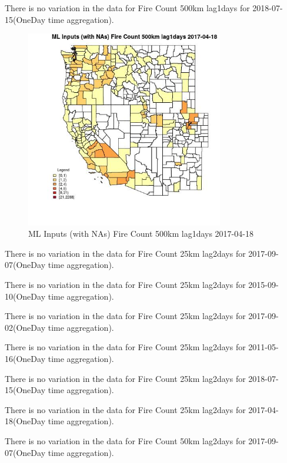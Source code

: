 There is no variation in the data for Fire Count 500km lag1days for 2018-07-15(OneDay time aggregation). 
 

\begin{figure} 
\centering  
\includegraphics[width=0.77\textwidth]{Code_Outputs/Report_ML_input_PM25_Step4_part_e_de_duplicated_aves_compiled_2019-05-21wNAs_CountyFire_Count_500km_lag1daysMean2017-04-18.jpg} 
\caption{\label{fig:Report_ML_input_PM25_Step4_part_e_de_duplicated_aves_compiled_2019-05-21wNAsCountyFire_Count_500km_lag1daysMean2017-04-18}ML Inputs (with NAs) Fire Count 500km lag1days 2017-04-18} 
\end{figure} 
 

There is no variation in the data for Fire Count 25km lag2days for 2017-09-07(OneDay time aggregation). 
 

There is no variation in the data for Fire Count 25km lag2days for 2015-09-10(OneDay time aggregation). 
 

There is no variation in the data for Fire Count 25km lag2days for 2017-09-02(OneDay time aggregation). 
 

There is no variation in the data for Fire Count 25km lag2days for 2011-05-16(OneDay time aggregation). 
 

There is no variation in the data for Fire Count 25km lag2days for 2018-07-15(OneDay time aggregation). 
 

There is no variation in the data for Fire Count 25km lag2days for 2017-04-18(OneDay time aggregation). 
 

There is no variation in the data for Fire Count 50km lag2days for 2017-09-07(OneDay time aggregation). 
 

